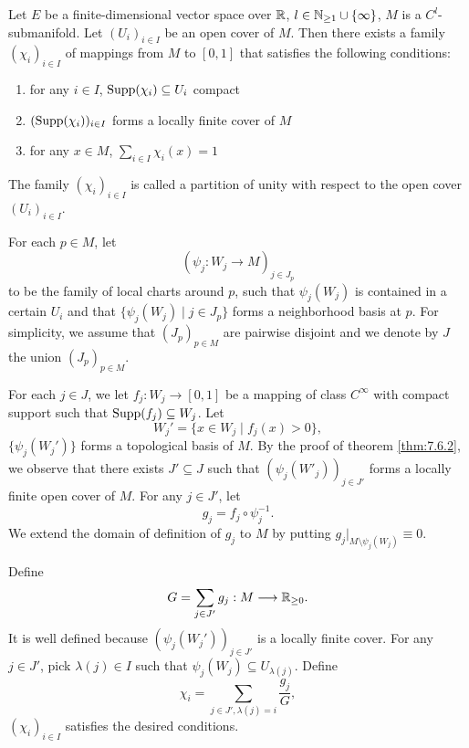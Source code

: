 \begin{theoremenv}
    Let $E$ be a finite-dimensional vector space over $\mathbb{R}$, $l \in \mathbb{N}_{\ge 1} \cup \{\infty\}$, $M$ is a $C^l$-submanifold.
    Let $(U_i)_{i \in I}$ be an open cover of $M$.
    Then there exists a family $(\chi_i)_{i \in I}$ of mappings from $M$ to $[0,1]$ that satisfies the following conditions:
    \begin{enumerate}
        \item for any $i \in I$, $\operatorname{\mathrm{Supp}} (\chi_i) \subseteq U_i$ compact
        \item $(\operatorname{\mathrm{Supp}}(\chi_i))_{i \in I}$ forms a locally finite cover of $M$
        \item for any $x \in M$, $\displaystyle \sum_{i \in I} \chi_i(x) = 1$
    \end{enumerate}
    The family $(\chi_i)_{i \in I}$ is called a partition of unity with respect to the open cover $(U_i)_{i \in I}$.
\end{theoremenv}
\begin{proofenv}
    For each $p \in M$, let 
    $$\left(\psi_j : W_j \longrightarrow M\right)_{j \in J_p}$$
    to be the family of local charts around $p$, such that $\psi_j(W_j)$ is contained in a certain $U_i$ and that $\{\psi_j(W_j) \mid j \in J_p\}$ forms a neighborhood basis at $p$.
    For simplicity, we assume that $(J_p)_{p \in M}$ are pairwise disjoint and we denote by $J$ the union $(J_p)_{p \in M}$.
    
    \quad For each $j \in J$, we let $f_j : W_j \longrightarrow [0,1]$ be a mapping of class $C^\infty$ with compact support such that $\operatorname{\mathrm{Supp}}(f_j) \subseteq W_j$.
    Let
    $$W_j' = \{x \in W_j \mid f_j(x) > 0\},$$
    $\{\psi_j(W_j')\}$ forms a topological basis of $M$.
    By the proof of theorem \ref{thm:7.6.2}, we observe that there exists $J' \subseteq J$ such that $(\psi_j(W'_j))_{j \in J'}$ forms a locally finite open cover of $M$.
    For any $j \in J'$, let
    $$g_j = f_j \circ \psi_j^{-1}.$$
    We extend the domain of definition of $g_j$ to $M$ by putting $g_j|_{M \setminus \psi_j(W_j)} \equiv 0$.

    \quad Define
    $$G = \sum_{j \in J'} g_j : M \longrightarrow \mathbb{R}_{\ge 0}.$$
    It is well defined because $(\psi_j(W_j'))_{j \in J'}$ is a locally finite cover.
    For any $j \in J'$, pick $\lambda(j) \in I$ such that $\psi_j(W_j) \subseteq U_{\lambda(j)}$.
    Define 
    $$\chi_i = \sum_{j \in J', \lambda(j) = i} \frac{g_j}{G},$$
    $(\chi_i)_{i \in I}$ satisfies the desired conditions.
\end{proofenv}


